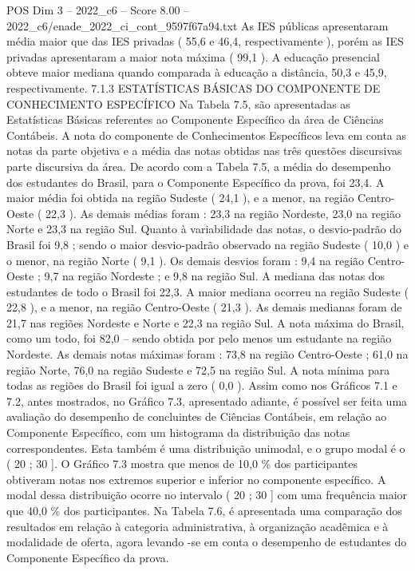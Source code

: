 \begin{textsample}{POS Dim 3 – 2022\_c6 – Score 8.00 – 2022\_c6/enade\_2022\_ci\_cont\_9597f67a94.txt}
As IES públicas apresentaram média maior que das IES privadas ( 55,6 e 46,4, respectivamente ), porém as IES privadas apresentaram a maior nota máxima ( 99,1 ).
A educação presencial obteve maior mediana quando comparada à educação a distância, 50,3 e 45,9, respectivamente. 7.1.3 ESTATÍSTICAS BÁSICAS DO COMPONENTE DE CONHECIMENTO ESPECÍFICO Na Tabela 7.5, são apresentadas as Estatísticas Básicas referentes ao Componente Específico da área de Ciências Contábeis.
A nota do componente de Conhecimentos Específicos leva em conta as notas da parte objetiva e a média das notas obtidas nas três questões discursivas parte discursiva da área.
De acordo com a Tabela 7.5, a média do desempenho dos estudantes do Brasil, para o Componente Específico da prova, foi 23,4.
A maior média foi obtida na região Sudeste ( 24,1 ), e a menor, na região Centro-Oeste ( 22,3 ).
As demais médias foram : 23,3 na região Nordeste, 23,0 na região Norte e 23,3 na região Sul.
Quanto à variabilidade das notas, o desvio-padrão do Brasil foi 9,8 ; sendo o maior desvio-padrão observado na região Sudeste ( 10,0 ) e o menor, na região Norte ( 9,1 ).
Os demais desvios foram : 9,4 na região Centro-Oeste ; 9,7 na região Nordeste ; e 9,8 na região Sul.
A mediana das notas dos estudantes de todo o Brasil foi 22,3.
A maior mediana ocorreu na região Sudeste ( 22,8 ), e a menor, na região Centro-Oeste ( 21,3 ).
As demais medianas foram de 21,7 nas regiões Nordeste e Norte e 22,3 na região Sul.
A nota máxima do Brasil, como um todo, foi 82,0 – sendo obtida por pelo menos um estudante na região Nordeste.
As demais notas máximas foram : 73,8 na região Centro-Oeste ; 61,0 na região Norte, 76,0 na região Sudeste e 72,5 na região Sul.
A nota mínima para todas as regiões do Brasil foi igual a zero ( 0,0 ).
Assim como nos Gráficos 7.1 e 7.2, antes mostrados, no Gráfico 7.3, apresentado adiante, é possível ser feita uma avaliação do desempenho de concluintes de Ciências Contábeis, em relação ao Componente Específico, com um histograma da distribuição das notas correspondentes.
Esta também é uma distribuição unimodal, e o grupo modal é o ( 20 ; 30 ].
O Gráfico 7.3 mostra que menos de 10,0 \% dos participantes obtiveram notas nos extremos superior e inferior no componente específico.
A modal dessa distribuição ocorre no intervalo ( 20 ; 30 ] com uma frequência maior que 40,0 \% dos participantes.
Na Tabela 7.6, é apresentada uma comparação dos resultados em relação à categoria administrativa, à organização acadêmica e à modalidade de oferta, agora levando -se em conta o desempenho de estudantes do Componente Específico da prova.

\end{textsample}
